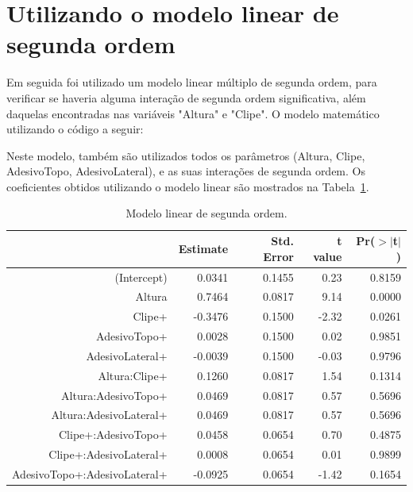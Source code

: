 
\section{Utilizando o modelo linear de segunda ordem}
\label{sec:a_modelagem_matematica_o_modelo_resultante}


Em seguida foi utilizado um modelo linear múltiplo de segunda ordem, para verificar se haveria alguma interação de segunda ordem significativa, além daquelas encontradas nas variáveis "Altura" e "Clipe". O modelo matemático utilizando o código a seguir:




Neste modelo, também são utilizados todos os parâmetros (Altura, Clipe, AdesivoTopo, AdesivoLateral), e as suas interações de segunda ordem. Os coeficientes obtidos utilizando o modelo linear são mostrados na Tabela~\ref{tab:segor}.

\begin{table}[ht]
    \centering
    \caption{Modelo linear de segunda ordem.}
    \begin{tabular}{rrrrr}
      \hline
     & Estimate & Std. Error & t value & Pr($>$$|$t$|$) \\ 
      \hline
    (Intercept) & 0.0341 & 0.1455 & 0.23 & 0.8159 \\ 
      Altura & 0.7464 & 0.0817 & 9.14 & 0.0000 \\ 
      Clipe+ & -0.3476 & 0.1500 & -2.32 & 0.0261 \\ 
      AdesivoTopo+ & 0.0028 & 0.1500 & 0.02 & 0.9851 \\ 
      AdesivoLateral+ & -0.0039 & 0.1500 & -0.03 & 0.9796 \\ 
      Altura:Clipe+ & 0.1260 & 0.0817 & 1.54 & 0.1314 \\ 
      Altura:AdesivoTopo+ & 0.0469 & 0.0817 & 0.57 & 0.5696 \\ 
      Altura:AdesivoLateral+ & 0.0469 & 0.0817 & 0.57 & 0.5696 \\ 
      Clipe+:AdesivoTopo+ & 0.0458 & 0.0654 & 0.70 & 0.4875 \\ 
      Clipe+:AdesivoLateral+ & 0.0008 & 0.0654 & 0.01 & 0.9899 \\ 
      AdesivoTopo+:AdesivoLateral+ & -0.0925 & 0.0654 & -1.42 & 0.1654 \\ 
       \hline
    \end{tabular}
    \label{tab:segor}
    \end{table}

